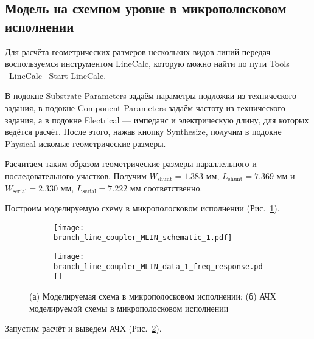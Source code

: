 \subsection{Модель на схемном уровне в микрополосковом исполнении}

Для расчёта геометрических размеров нескольких видов линий передач воспользуемся инструментом LineCalc, которую можно найти по пути Tools \textrightarrow\ LineCalc \textrightarrow\ Start LineCalc.

В подокне Substrate Parameters задаём параметры подложки из технического задания, в подокне Component Parameters задаём частоту из технического задания, а в подокне Electrical --- импеданс и электрическую длину, для которых ведётся расчёт.
После этого, нажав кнопку Synthesize, получим в подокне Physical искомые геометрические размеры.

Расчитаем таким образом геометрические размеры параллельного и последовательного участков.
Получим $W_\text{shunt} = 1.383 \text{~мм}$, $L_\text{shunt} = 7.369 \text{~мм}$ и $W_\text{serial} = 2.330 \text{~мм}$, $L_\text{serial} = 7.222 \text{~мм}$ соответственно.

Построим моделируемую схему в микрополосковом исполнении (Рис.~\ref{fig:branch_line_coupler_MLIN_schematic_1}).

\begin{figure}[!ht]
    \centering
    \begin{subfigure}[b]{0.5\textwidth}
        \centering
        \texttt{[image: branch\_line\_coupler\_MLIN\_schematic\_1.pdf]}
        \caption{}%
        \label{fig:branch_line_coupler_MLIN_schematic_1}
    \end{subfigure}
    \hfill
    \begin{subfigure}[b]{0.4\textwidth}
        \centering
        \texttt{[image: branch\_line\_coupler\_MLIN\_data\_1\_freq\_response.pdf]}
        \caption{}%
        \label{fig:branch_line_coupler_MLIN_data_1_freq_response}
    \end{subfigure}
    \caption{%
        (а) Моделируемая схема в микрополосковом исполнении;
        (б) АЧХ моделируемой схемы в микрополосковом исполнении
    }%
    \label{fig:branch_line_coupler_MLIN}
\end{figure}

Запустим расчёт и выведем АЧХ (Рис.~\ref{fig:branch_line_coupler_MLIN_data_1_freq_response}).

